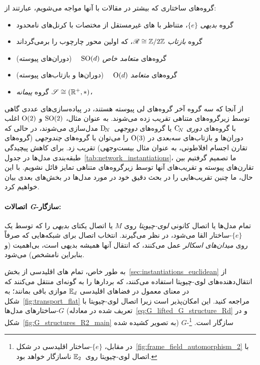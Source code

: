 گروه‌های ساختاری که بیشتر در مقالات با آنها مواجه می‌شویم، عبارتند از:
\begin{itemize}
	\item[{\rule[2.0pt]{2pt}{2pt}}]
	گروه \emph{بدیهی} $\{e\}$، متناظر با \CNN های غیرمستقل از مختصات با کرنل‌های نامحدود
	\item[{\rule[2.0pt]{2pt}{2pt}}]
	گروه \emph{بازتاب} $\mathscr{R} \cong \mathbb{Z}/2\mathbb{Z}$، که اولین محور چارچوب را برمی‌گرداند
	\item[{\rule[2.0pt]{2pt}{2pt}}]
	گروه‌های \emph{متعامد خاص} $\operatorname{SO}(d)$
	\ \ (دوران‌های پیوسته)
	\item[{\rule[2.0pt]{2pt}{2pt}}]
	گروه‌های \emph{متعامد} $\operatorname{O}(d)$
	\ \ (دوران‌ها و بازتاب‌های پیوسته)
	\item[{\rule[2.0pt]{2pt}{2pt}}]
	گروه \emph{پیمانه} $\mathscr{S} \cong (\mathbb{R}^+,*)$،
\end{itemize}
از آنجا که سه گروه آخر گروه‌های لی پیوسته هستند، در پیاده‌سازی‌های عددی گاهی توسط زیرگروه‌های متناهی تقریب زده می‌شوند.
به عنوان مثال، $\operatorname{SO}(2)$ و $\operatorname{O}(2)$ اغلب با گروه‌های \emph{دوری} $\operatorname{C}_{\!N}$ یا گروه‌های \emph{دووجهی}~$\operatorname{D}_{\!N}$ مدل‌سازی می‌شوند، در حالی که دوران‌ها و بازتاب‌های سه‌بعدی در $\operatorname{O}(3)$ را می‌توان با گروه‌های \emph{چندوجهی} (گروه‌های تقارن اجسام افلاطونی، به عنوان مثال بیست‌وجهی) تقریب زد.
برای کاهش پیچیدگی طبقه‌بندی مدل‌ها در جدول~\ref{tab:network_instantiations}، ما تصمیم گرفتیم بین تقارن‌های پیوسته و تقریب‌های آنها توسط زیرگروه‌های متناهی تمایز قائل نشویم.
با این حال، ما چنین تقریب‌هایی را در بحث دقیق خود در مورد مدل‌ها در بخش‌های بعدی بیان خواهیم کرد.

\paragraph{اتصالات \textit{G}-سازگار:}
تمام مدل‌ها یا اتصال کانونی \emph{لوی-چیویتا} روی $M$ یا اتصال یکتای \emph{بدیهی} را که توسط یک $\{e\}$-ساختار القا می‌شود، در نظر می‌گیرند.
انتخاب اتصال برای شبکه‌هایی که صرفاً روی \emph{میدان‌های اسکالر} عمل می‌کنند، که انتقال آنها همیشه بدیهی است، بی‌اهمیت (و بنابراین نامشخص) می‌شود.

به طور خاص، تمام \CNN های اقلیدسی از بخش~\ref{sec:instantiations_euclidean} از انتقال‌دهنده‌های لوی-چیویتا استفاده می‌کنند، که بردارها را به گونه‌ای منتقل می‌کنند که در معنای معمول در فضاهای اقلیدسی $\mathbb{E}_d$ موازی باقی بمانند؛ به شکل~\ref{fig:transport_flat} مراجعه کنید.
این امکان‌پذیر است زیرا اتصال لوی-چیویتا با $G$-ساختارهای مدل‌ها (تعریف شده در معادله~\eqref{eq:G_lifted_G_structure_Rd} و در شکل~\ref{fig:G_structures_R2_main} به تصویر کشیده شده) $G$-سازگار است.%
\footnote{
	در مقابل، $\{e\}$-ساختار اقلیدسی در شکل~\ref{fig:frame_field_automorphism_2} با اتصال لوی-چیویتا روی~$\mathbb{E}_2$ ناسازگار خواهد بود.
}


